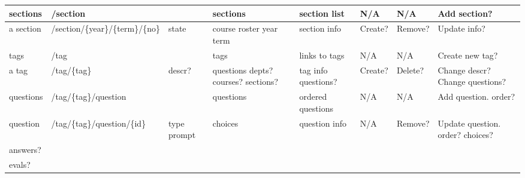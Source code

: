 \documentclass[10pt]{article}
\begin{document}
\begin{landscape}
\begin{longtable}[]{llp{1.5cm}p{2cm}p{2.5cm}llp{2.5cm}}
sections & /section &  & sections & section list & N/A & N/A & Add section?\tabularnewline
\hline

a section & /section/\{year\}/\{term\}/\{no\} & state & course roster year term & section info & Create? & Remove? & Update info?\tabularnewline
\hline

tags & /tag &  & tags & links to tags & N/A & N/A & Create new tag?\tabularnewline
\hline

a tag & /tag/\{tag\} & descr? & questions depts? courses? sections? & tag info questions? & Create? & Delete? & Change descr? Change questions?\tabularnewline
\hline

questions & /tag/\{tag\}/question &  & questions & ordered questions & N/A & N/A & Add question. order?\tabularnewline
\hline

question & /tag/\{tag\}/question/\{id\} & type prompt & choices & question info & N/A & Remove? & Update question. order? choices?\tabularnewline
\hline

answers? &  &  &  &  &  &  & \tabularnewline
\hline

evals? &  &  &  &  &  &  & \tabularnewline
\hline
\bottomrule
\end{longtable}
\end{landscape}
\end{document}
